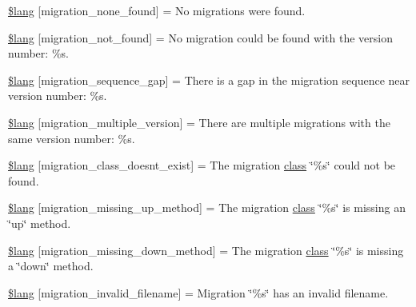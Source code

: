 \begin{DoxyCompactItemize}
\item 
\mbox{\hyperlink{migration__lang_8php_afe8d1d5a799cf952a04537e8b532c3d8}{\$lang}} \mbox{[}\textquotesingle{}migration\+\_\+none\+\_\+found\textquotesingle{}\mbox{]} = \textquotesingle{}No migrations were found.\textquotesingle{}
\item 
\mbox{\hyperlink{migration__lang_8php_ae6e7f5ef38bcbaf7b91c1324e463aa76}{\$lang}} \mbox{[}\textquotesingle{}migration\+\_\+not\+\_\+found\textquotesingle{}\mbox{]} = \textquotesingle{}No migration could be found with the version number\+: \%s.\textquotesingle{}
\item 
\mbox{\hyperlink{migration__lang_8php_a0ceeae7dff9f2e5ca94c1b2de395e49a}{\$lang}} \mbox{[}\textquotesingle{}migration\+\_\+sequence\+\_\+gap\textquotesingle{}\mbox{]} = \textquotesingle{}There is a gap in the migration sequence near version number\+: \%s.\textquotesingle{}
\item 
\mbox{\hyperlink{migration__lang_8php_ac377d2c284639a9d888aa911bd116a5e}{\$lang}} \mbox{[}\textquotesingle{}migration\+\_\+multiple\+\_\+version\textquotesingle{}\mbox{]} = \textquotesingle{}There are multiple migrations with the same version number\+: \%s.\textquotesingle{}
\item 
\mbox{\hyperlink{migration__lang_8php_a3bc11444283db3c991fe89233611ff71}{\$lang}} \mbox{[}\textquotesingle{}migration\+\_\+class\+\_\+doesnt\+\_\+exist\textquotesingle{}\mbox{]} = \textquotesingle{}The migration \mbox{\hyperlink{waiter_2olaporan_8php_a185c73c6507391d1eb38c776b68ce96d}{class}} \char`\"{}\%s\char`\"{} could not be found.\textquotesingle{}
\item 
\mbox{\hyperlink{migration__lang_8php_afc56383c5f93b9eb65f6249826d76f99}{\$lang}} \mbox{[}\textquotesingle{}migration\+\_\+missing\+\_\+up\+\_\+method\textquotesingle{}\mbox{]} = \textquotesingle{}The migration \mbox{\hyperlink{waiter_2olaporan_8php_a185c73c6507391d1eb38c776b68ce96d}{class}} \char`\"{}\%s\char`\"{} is missing an \char`\"{}up\char`\"{} method.\textquotesingle{}
\item 
\mbox{\hyperlink{migration__lang_8php_ab3b0b516243ce7ea4153798e808d0395}{\$lang}} \mbox{[}\textquotesingle{}migration\+\_\+missing\+\_\+down\+\_\+method\textquotesingle{}\mbox{]} = \textquotesingle{}The migration \mbox{\hyperlink{waiter_2olaporan_8php_a185c73c6507391d1eb38c776b68ce96d}{class}} \char`\"{}\%s\char`\"{} is missing a \char`\"{}down\char`\"{} method.\textquotesingle{}
\item 
\mbox{\hyperlink{migration__lang_8php_ac8e3b2b2f1cbd7c9863f108908efb424}{\$lang}} \mbox{[}\textquotesingle{}migration\+\_\+invalid\+\_\+filename\textquotesingle{}\mbox{]} = \textquotesingle{}Migration \char`\"{}\%s\char`\"{} has an invalid filename.\textquotesingle{}
\end{DoxyCompactItemize}


